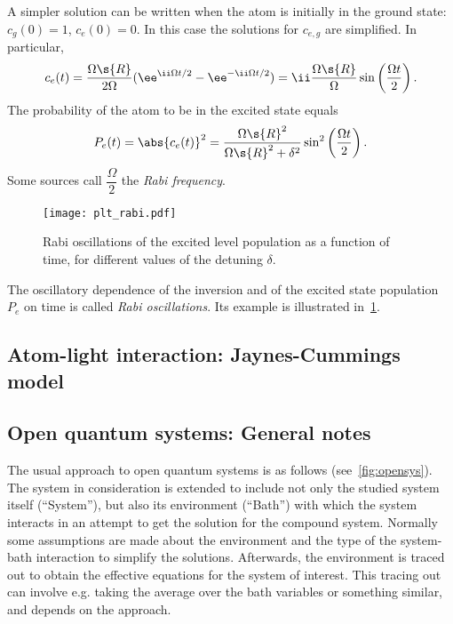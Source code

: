 \documentclass[fontsize=9pt,twoside=semi,bookmarkpackage=false]{scrartcl}
\begin{document}
A simpler solution can be written when the atom is initially in the ground state: $c_g (0) = 1$, $c_e (0) = 0$.
In this case the solutions for $c_{e,g }$ are simplified.
In particular,
\begin{equation}
  c_e (t)
  = \frac{ \Omega\s{R} }{ 2 \Omega } ( \ee^{ \ii \Omega t / 2 } - \ee^{- \ii \Omega t /2 } )
  = \ii \frac{ \Omega\s{R} }{  \Omega } \sin \left( \frac{ \Omega t }{ 2 } \right).
\end{equation}
The probability of the atom to be in the excited state equals
\begin{equation}
  P_e(t) = \abs{ c_e (t) }^2 = \frac{ \Omega\s{R}^2 }{ \Omega\s{R}^2 + \delta^2 } \sin^2 \left( \frac{ \Omega t }{ 2 } \right).
\end{equation}
Some sources call $\dfrac \Omega  2 $ the \emph{Rabi frequency}.

\begin{figure}[htb]
  \centering
  \texttt{[image: plt\_rabi.pdf]}
  \caption{Rabi oscillations of the excited level population as a function of time, for different values of the detuning $\delta$.}
  \label{fig:plt_rabi-pdf}
\end{figure}
The oscillatory dependence of the inversion and of the excited state population $P_e$ on time is called \emph{Rabi oscillations}.
Its example is illustrated in~\cref{fig:plt_rabi-pdf}.



\subsection{Atom-light interaction: Jaynes-Cummings model} %
\label{sec:atom_light_interaction_jaynes_cummings_model}


\subsection{Open quantum systems: General notes} %
\label{sec:open_quantum_systems}

The usual approach to open quantum systems is as follows (see~\cref{fig:opensys}).
The system in consideration is extended to include not only the studied system itself (``System''), but also its environment (``Bath'') with which the system interacts in an attempt to get the solution for the compound system.
Normally some assumptions are made about the environment and the type of the system-bath interaction to simplify the solutions.
Afterwards, the environment is traced out to obtain the effective equations for the system of interest.
This tracing out can involve e.g. taking the average over the bath variables or something similar, and depends on the approach.
\end{document}
